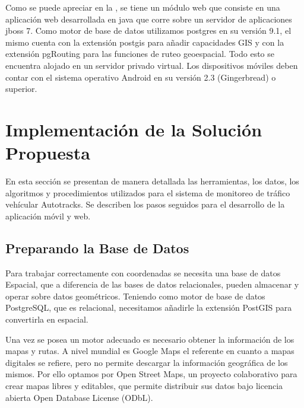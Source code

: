 Como se puede apreciar en la , se tiene un módulo web que consiste en una aplicación web desarrollada en java que corre sobre un servidor de aplicaciones jboss 7. Como motor de base de datos utilizamos postgres en su versión 9.1, el mismo cuenta con la extensión postgis para añadir capacidades GIS y con la extensión pgRouting para las funciones de ruteo geoespacial. Todo esto se encuentra alojado en un servidor privado virtual. Los dispositivos móviles deben contar con el sistema operativo Android en su versión 2.3 (Gingerbread) o superior.

\section{Implementación de la Solución Propuesta}

En esta sección se presentan de manera detallada las herramientas, los datos, los algoritmos y procedimientos utilizados para el sistema de monitoreo de tráfico vehícular Autotracks. Se describen los pasos seguidos para el desarrollo de la aplicación móvil y web.

\subsection{Preparando la Base de Datos}

Para trabajar correctamente con coordenadas se necesita una base de datos Espacial, que a diferencia de las bases de datos relacionales, pueden almacenar y operar sobre datos geométricos. Teniendo como motor de base de datos PostgreSQL, que es relacional, necesitamos añadirle la extensión PostGIS para convertirla en espacial.

Una vez se posea un motor adecuado es necesario obtener la información de los mapas y rutas. A nivel mundial es Google Maps el referente en cuanto a mapas digitales se refiere, pero no permite descargar la información geográfica de los mismos. Por ello optamos por Open Street Maps, un proyecto colaborativo para crear mapas libres y editables, que permite distribuir sus datos bajo licencia abierta Open Database License (ODbL).

